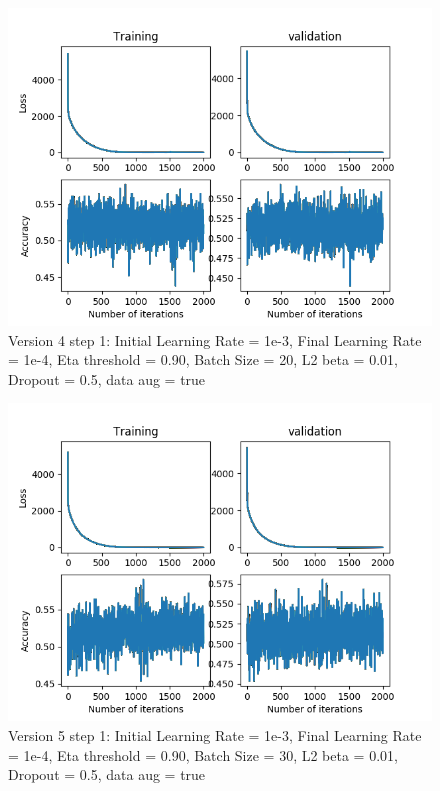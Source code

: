 \documentclass[12pt,reqno]{amsart}
\numberwithin{equation}{section}
\begin{document}
\begin{enumerate}
\begin{figure}[H]
\centering
\includegraphics[scale=0.6]{data_liquid155_version4_step1}
\caption{Version 4 step 1: Initial Learning Rate = 1e-3, Final Learning Rate = 1e-4, Eta threshold = 0.90, Batch Size = 20, L2 beta = 0.01, Dropout = 0.5, data aug = true}
\end{figure}

\begin{figure}[H]
\centering
\includegraphics[scale=0.6]{data_liquid155_version5_step1}
\caption{Version 5 step 1: Initial Learning Rate = 1e-3, Final Learning Rate = 1e-4, Eta threshold = 0.90, Batch Size = 30, L2 beta = 0.01, Dropout = 0.5, data aug = true}
\end{figure}


\end{enumerate}
\end{document}
